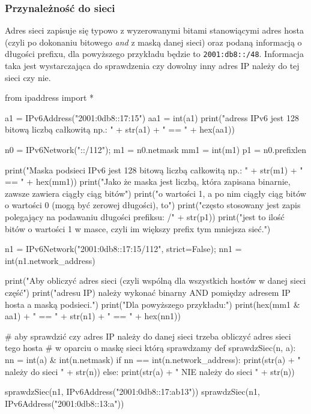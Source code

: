 \documentclass{pdfBooklets}
\begin{document}
\subsubsection{Przynależność do sieci}
Adres sieci zapisuje się typowo z wyzerowanymi bitami stanowiącymi adres hosta (czyli po dokonaniu bitowego \emph{and} z maską danej sieci) oraz podaną informacją o długości prefixu, dla powyższego przykładu będzie to \Verb$2001:db8::/48$. Informacja taka jest wystarczająca do sprawdzenia czy dowolny inny adres IP należy do tej sieci czy nie.

\begin{CodeFrame*}[python][fontsize=\footnotesize]{}
from ipaddress import *

a1  = IPv6Address("2001:0db8::17:15")
aa1 = int(a1)
print("adress IPv6 jest 128 bitową liczbą całkowitą np.: " + str(a1) + " == " + hex(aa1))

n0  = IPv6Network("::/112");
m1  = n0.netmask
mm1 = int(m1)
p1  = n0.prefixlen

print("Maska podsieci IPv6 jest 128 bitową liczbą całkowitą np.: " + str(m1) + " == " + hex(mm1))
print("Jako że maska jest liczbą, która zapisana binarnie, zawsze zawiera ciągły ciąg bitów")
print("o wartości 1, a po nim ciągły ciąg bitów o wartości 0 (mogą być zerowej długości), to")
print("często stosowany jest zapis polegający na podawaniu długości prefiksu: /" + str(p1))
print("jest to ilość bitów o wartości 1 w masce, czyli im większy prefix tym mniejsza sieć.")

n1  = IPv6Network("2001:0db8::17:15/112", strict=False);
nn1 = int(n1.network_address)

print("Aby obliczyć adres sieci (czyli wspólną dla wszystkich hostów w danej sieci część")
print("adresu IP) należy wykonać binarny AND pomiędzy adresem IP hosta a maską podsieci.")
print("Dla powyższego przykładu:")
print(hex(mm1 & aa1) + " == " + str(n1) + " == " + hex(nn1))

# aby sprawdzić czy adres IP należy do danej sieci trzeba obliczyć adres sieci tego hosta
# w oparciu o maskę sieci którą sprawdzamy
def sprawdzSiec(n, a):
	nn = int(a) & int(n.netmask)
	if nn == int(n.network_address):
		print(str(a) + " należy do sieci " + str(n))
	else:
		print(str(a) + " NIE należy do sieci " + str(n))

sprawdzSiec(n1, IPv6Address("2001:0db8::17:ab13"))
sprawdzSiec(n1, IPv6Address("2001:0db8::13:a"))
\end{CodeFrame*}

\end{document}
